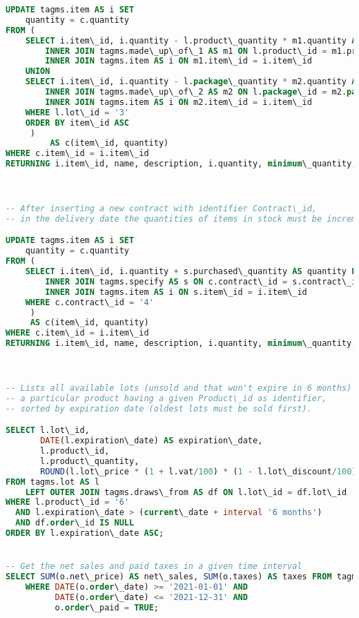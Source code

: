 \begin{lstlisting}[language=SQL,
keywordstyle=\color{blue},
stringstyle=\color{mauve},
showstringspaces=false,
basicstyle=\ttfamily\footnotesize]
UPDATE tagms.item AS i SET
    quantity = c.quantity
FROM (
    SELECT i.item\_id, i.quantity - l.product\_quantity * m1.quantity AS quantity FROM tagms.lot AS l
        INNER JOIN tagms.made\_up\_of\_1 AS m1 ON l.product\_id = m1.product\_id
        INNER JOIN tagms.item AS i ON m1.item\_id = i.item\_id
    UNION
    SELECT i.item\_id, i.quantity - l.package\_quantity * m2.quantity AS quantity FROM tagms.lot AS l
        INNER JOIN tagms.made\_up\_of\_2 AS m2 ON l.package\_id = m2.package\_id
        INNER JOIN tagms.item AS i ON m2.item\_id = i.item\_id
    WHERE l.lot\_id = '3'
    ORDER BY item\_id ASC
     )
         AS c(item\_id, quantity)
WHERE c.item\_id = i.item\_id
RETURNING i.item\_id, name, description, i.quantity, minimum\_quantity, item\_category\_id;



-- After inserting a new contract with identifier Contract\_id,
-- in the delivery date the quantities of items in stock must be incremented

UPDATE tagms.item AS i SET
    quantity = c.quantity
FROM (
    SELECT i.item\_id, i.quantity + s.purchased\_quantity AS quantity FROM tagms.contract AS c
        INNER JOIN tagms.specify AS s ON c.contract\_id = s.contract\_id
        INNER JOIN tagms.item AS i ON s.item\_id = i.item\_id
    WHERE c.contract\_id = '4'
     )
     AS c(item\_id, quantity)
WHERE c.item\_id = i.item\_id
RETURNING i.item\_id, name, description, i.quantity, minimum\_quantity, item\_category\_id;



-- Lists all available lots (unsold and that won't expire in 6 months) containing
-- a particular product having a given Product\_id as identifier,
-- sorted by expiration date (oldest lots must be sold first).

SELECT l.lot\_id,
       DATE(l.expiration\_date) AS expiration\_date,
       l.product\_id,
       l.product\_quantity,
       ROUND(l.lot\_price * (1 + l.vat/100) * (1 - l.lot\_discount/100), 2) AS gross\_price
FROM tagms.lot AS l
    LEFT OUTER JOIN tagms.draws\_from AS df ON l.lot\_id = df.lot\_id
WHERE l.product\_id = '6'
  AND l.expiration\_date > (current\_date + interval '6 months')
  AND df.order\_id IS NULL
ORDER BY l.expiration\_date ASC;


-- Get the net sales and paid taxes in a given time interval
SELECT SUM(o.net\_price) AS net\_sales, SUM(o.taxes) AS taxes FROM tagms.order AS o
    WHERE DATE(o.order\_date) >= '2021-01-01' AND
          DATE(o.order\_date) <= '2021-12-31' AND
          o.order\_paid = TRUE;


\end{lstlisting}
